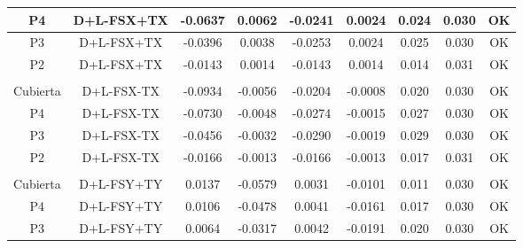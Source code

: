 \begin{table}[H]
{\begin{tabular}{|c|c|c|c|c|c|c|c|c|}
    \hline
    P4  & D+L-FSX+TX & -0.0637 & 0.0062 & -0.0241 & 0.0024 & 0.024 & 0.030 & \cellcolor[rgb]{ .776,  .937,  .808}\textcolor[rgb]{ 0,  .38,  0}{OK} \bigstrut\\
    \hline
    P3  & D+L-FSX+TX & -0.0396 & 0.0038 & -0.0253 & 0.0024 & 0.025 & 0.030 & \cellcolor[rgb]{ .776,  .937,  .808}\textcolor[rgb]{ 0,  .38,  0}{OK} \bigstrut\\
    \hline
    P2  & D+L-FSX+TX & -0.0143 & 0.0014 & -0.0143 & 0.0014 & 0.014 & 0.031 & \cellcolor[rgb]{ .776,  .937,  .808}\textcolor[rgb]{ 0,  .38,  0}{OK} \bigstrut\\
    \hline
    \multicolumn{1}{|r}{} & \multicolumn{1}{r}{} & \multicolumn{1}{r}{} & \multicolumn{1}{r}{} & \multicolumn{1}{r}{} & \multicolumn{1}{r}{} & \multicolumn{1}{r}{} & \multicolumn{1}{r}{} &  \bigstrut\\
    \hline
    Cubierta & D+L-FSX-TX & -0.0934 & -0.0056 & -0.0204 & -0.0008 & 0.020 & 0.030 & \cellcolor[rgb]{ .776,  .937,  .808}\textcolor[rgb]{ 0,  .38,  0}{OK} \bigstrut\\
    \hline
    P4  & D+L-FSX-TX & -0.0730 & -0.0048 & -0.0274 & -0.0015 & 0.027 & 0.030 & \cellcolor[rgb]{ .776,  .937,  .808}\textcolor[rgb]{ 0,  .38,  0}{OK} \bigstrut\\
    \hline
    P3  & D+L-FSX-TX & -0.0456 & -0.0032 & -0.0290 & -0.0019 & 0.029 & 0.030 & \cellcolor[rgb]{ .776,  .937,  .808}\textcolor[rgb]{ 0,  .38,  0}{OK} \bigstrut\\
    \hline
    P2  & D+L-FSX-TX & -0.0166 & -0.0013 & -0.0166 & -0.0013 & 0.017 & 0.031 & \cellcolor[rgb]{ .776,  .937,  .808}\textcolor[rgb]{ 0,  .38,  0}{OK} \bigstrut\\
    \hline
    \multicolumn{1}{|r}{} & \multicolumn{1}{r}{} & \multicolumn{1}{r}{} & \multicolumn{1}{r}{} & \multicolumn{1}{r}{} & \multicolumn{1}{r}{} & \multicolumn{1}{r}{} & \multicolumn{1}{r}{} &  \bigstrut\\
    \hline
    Cubierta & D+L-FSY+TY & 0.0137 & -0.0579 & 0.0031 & -0.0101 & 0.011 & 0.030 & \cellcolor[rgb]{ .776,  .937,  .808}\textcolor[rgb]{ 0,  .38,  0}{OK} \bigstrut\\
    \hline
    P4  & D+L-FSY+TY & 0.0106 & -0.0478 & 0.0041 & -0.0161 & 0.017 & 0.030 & \cellcolor[rgb]{ .776,  .937,  .808}\textcolor[rgb]{ 0,  .38,  0}{OK} \bigstrut\\
    \hline
    P3  & D+L-FSY+TY & 0.0064 & -0.0317 & 0.0042 & -0.0191 & 0.020 & 0.030 & \cellcolor[rgb]{ .776,  .937,  .808}\textcolor[rgb]{ 0,  .38,  0}{OK} \bigstrut\\

\end{tabular}}
\end{table}

